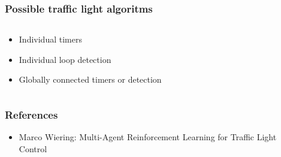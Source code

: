\documentclass[11pt]{beamer}
\begin{document}
\begin{frame}
\frametitle{Possible traffic light algoritms}
\begin{columns}
    \begin{column}{.5\textwidth}
        \begin{itemize}
            \item Individual timers
            \item Individual loop detection
            \item Globally connected timers or detection
        \end{itemize}
    \end{column}
    \begin{column}{.5\textwidth}
    \end{column}
\end{columns}
\end{frame}

\begin{frame}
\frametitle{References}
\begin{itemize}
    \item Marco Wiering: Multi-Agent Reinforcement Learning for Traffic Light Control
\end{itemize}
\end{frame}
\end{document}
